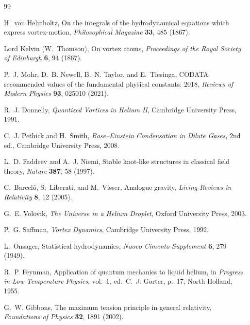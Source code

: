 \documentclass[aps,pra,preprint,longbibliography,nofootinbib]{revtex4-2}
\begin{document}
\begin{thebibliography}{99}

H.~von Helmholtz,
On the integrals of the hydrodynamical equations which express
vortex-motion,
\textit{Philosophical Magazine} \textbf{33}, 485 (1867).

Lord Kelvin (W.~Thomson),
On vortex atoms,
\textit{Proceedings of the Royal Society of Edinburgh} \textbf{6},
94 (1867).

P.~J. Mohr, D.~B. Newell, B.~N. Taylor, and E.~Tiesinga,
CODATA recommended values of the fundamental physical constants: 2018,
\textit{Reviews of Modern Physics} \textbf{93}, 025010 (2021).

R.~J. Donnelly,
\textit{Quantized Vortices in Helium II},
Cambridge University Press, 1991.

C.~J. Pethick and H.~Smith,
\textit{Bose–Einstein Condensation in Dilute Gases}, 2nd ed.,
Cambridge University Press, 2008.

L.~D. Faddeev and A.~J. Niemi,
Stable knot-like structures in classical field theory,
\textit{Nature} \textbf{387}, 58 (1997).

C.~Barceló, S.~Liberati, and M.~Visser,
Analogue gravity,
\textit{Living Reviews in Relativity} \textbf{8}, 12 (2005).

G.~E. Volovik,
\textit{The Universe in a Helium Droplet},
Oxford University Press, 2003.

P.~G. Saffman,
\textit{Vortex Dynamics},
Cambridge University Press, 1992.

L.~Onsager,
Statistical hydrodynamics,
\textit{Nuovo Cimento Supplement} \textbf{6}, 279 (1949).

R.~P. Feynman,
Application of quantum mechanics to liquid helium,
in \textit{Progress in Low Temperature Physics}, vol.~1,
ed.\ C.~J. Gorter, p.~17,
North-Holland, 1955.

G.~W. Gibbons,
The maximum tension principle in general relativity,
\textit{Foundations of Physics} \textbf{32}, 1891 (2002).


\end{thebibliography}
\end{document}
